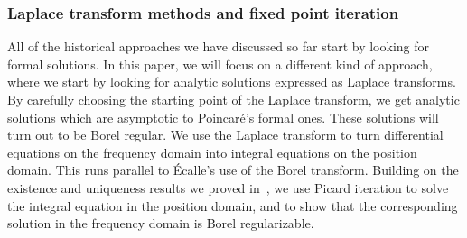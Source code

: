 \documentclass{article}
\theoremstyle{definition}
\theoremstyle{plain}
\begin{document}
\subsubsection{Laplace transform methods and fixed point iteration}
%
All of the historical approaches we have discussed so far start by looking for formal solutions. In this paper, we will focus on a different kind of approach, where we start by looking for analytic solutions expressed as Laplace transforms. By carefully choosing the starting point of the Laplace transform, we get analytic solutions which are asymptotic to Poincar\'{e}'s formal ones. These solutions will turn out to be Borel regular.
We use the Laplace transform to turn differential equations on the frequency domain into integral equations on the position domain. This runs parallel to \'{E}calle's use of the Borel transform. Building on the existence and uniqueness results we proved in~\cite{reg-sing-volterra}, we use Picard iteration to solve the integral equation in the position domain, and to show that the corresponding solution in the frequency domain is Borel regularizable.%
\end{document}

